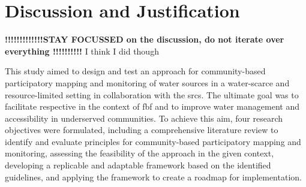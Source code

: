 
\chapter{Discussion and Justification} %

\label{chapter5} %



\textbf{!!!!!!!!!!!!!STAY FOCUSSED on the discussion, do not iterate over everything !!!!!!!!!!} I think I did though









This study aimed to design and test an approach for community-based participatory mapping and monitoring of water sources in a water-scarce and resource-limited setting in collaboration with the \acrlong{srcs}. The ultimate goal was to facilitate respective  in the context of \acrlong{fbf} and to improve water management and accessibility in underserved communities. To achieve this aim, four research objectives were formulated, including a comprehensive literature review to identify and evaluate principles for community-based participatory mapping and monitoring, assessing the feasibility of the approach in the given context, developing a replicable and adaptable framework based on the identified guidelines, and applying the framework to create a roadmap for implementation.\newline

